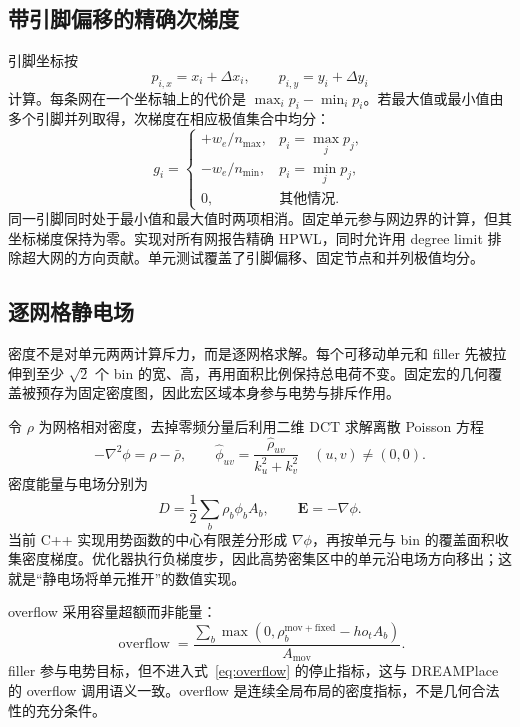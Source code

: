 \documentclass[UTF8,a4paper,11pt]{ctexart}
\newcommand{\OVF}{\operatorname{overflow}}
\begin{document}
\subsection{带引脚偏移的精确次梯度}

引脚坐标按
\begin{equation}
  p_{i,x}=x_i+\Delta x_i,\qquad
  p_{i,y}=y_i+\Delta y_i
\end{equation}
计算。每条网在一个坐标轴上的代价是 \(\max_i p_i-\min_i p_i\)。若最大值或最小值由多个引脚并列取得，次梯度在相应极值集合中均分：
\begin{equation}
  g_i=
  \begin{cases}
  +w_e/n_{\max}, & p_i=\max_j p_j,\\
  -w_e/n_{\min}, & p_i=\min_j p_j,\\
  0, & \text{其他情况}.
  \end{cases}
\end{equation}
同一引脚同时处于最小值和最大值时两项相消。固定单元参与网边界的计算，但其坐标梯度保持为零。实现对所有网报告精确 HPWL，同时允许用 degree limit 排除超大网的方向贡献。单元测试覆盖了引脚偏移、固定节点和并列极值均分。

\subsection{逐网格静电场}

密度不是对单元两两计算斥力，而是逐网格求解。每个可移动单元和 filler 先被拉伸到至少 \(\sqrt{2}\) 个 bin 的宽、高，再用面积比例保持总电荷不变。固定宏的几何覆盖被预存为固定密度图，因此宏区域本身参与电势与排斥作用。

令 \(\rho\) 为网格相对密度，去掉零频分量后利用二维 DCT 求解离散 Poisson 方程
\begin{equation}
  -\nabla^2\phi=\rho-\bar\rho,
  \qquad
  \widehat{\phi}_{uv}=\frac{\widehat{\rho}_{uv}}
  {k_u^2+k_v^2}\quad (u,v)\ne(0,0).
\end{equation}
密度能量与电场分别为
\begin{equation}
  D=\frac{1}{2}\sum_b \rho_b\phi_b A_b,
  \qquad \boldsymbol{E}=-\nabla\phi.
\end{equation}
当前 C++ 实现用势函数的中心有限差分形成 \(\nabla\phi\)，再按单元与 bin 的覆盖面积收集密度梯度。优化器执行负梯度步，因此高势密集区中的单元沿电场方向移出；这就是“静电场将单元推开”的数值实现。

overflow 采用容量超额而非能量：
\begin{equation}
  \OVF=\frac{\sum_b\max(0,\rho_b^{\mathrm{mov+fixed}}-
ho_t A_b)}
  {A_{\mathrm{mov}}}.
  \label{eq:overflow}
\end{equation}
filler 参与电势目标，但不进入式~\eqref{eq:overflow} 的停止指标，这与 DREAMPlace 的 overflow 调用语义一致。overflow 是连续全局布局的密度指标，不是几何合法性的充分条件。
\end{document}
